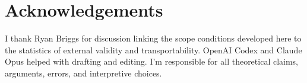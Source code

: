 \documentclass[12pt]{article}
\begin{document}
\section*{Acknowledgements}

I thank Ryan Briggs for discussion linking the scope conditions developed here to
the statistics of external validity and transportability. OpenAI Codex and Claude
Opus helped with drafting and editing. I'm responsible for all theoretical claims,
arguments, errors, and interpretive choices.

\clearpage
\begingroup
\setlength{\emergencystretch}{2em}
\printbibliography
\endgroup
\end{document}
